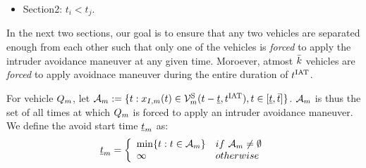 {\begin{itemize}
\begin{itemize}
\item Section12: Next we want to make sure that $\veh_i$ is far away from this set such that the intruder will need atleast a duration of $\brd$ to reach any state such that $\state_{\intr,i}$ is on the boundary of the avoid set of $\veh_i$. In relative co-ordinates, if we compute min-min set and augment it on set in Section 11, and ensure that the boundary of the avoid region is outside this augmented set then we are done. Draw a table listing the duration of each set. Mention the duration relationships. Draw a diagram showing different sets. 
\item Section13: Obstacle computation. First compute the directly induced obstacle by $\veh_j$ at time $t$ for all possible $\tsa$. Then compute the obstacle that $\veh_i$ need to avoid at any future time for different $\tsa$. Therefore, compute the BRS that it needs to avoid at $\tsa$.    
\end{itemize}
\item Section2: $t_i < t_j$.
\end{itemize}
}

In the next two sections, our goal is to ensure that any two vehicles are separated enough from each other such that only one of the vehicles is \textit{forced} to apply the intruder avoidance maneuver at any given time. Moroever, atmost $\bar{k}$ vehicles are \textit{forced} to apply avoidnace maneuver during the entire duration of $t^\text{IAT}$. 

For vehicle $Q_m$, let $\mathcal{A}_{m} := \{t: x_{I,m}(t) \in \mathcal{V}^{\text{S}}_{m}(t-\underline{t}, t^\text{IAT}), t \in [\underline{t}, \bar{t}]\}$. $\mathcal{A}_{m}$ is thus the set of all times at which $Q_m$ is forced to apply an intruder avoidance maneuver. We define the avoid start time $\underline{t}_m$ as:
\begin{equation}
\underline{t}_m  = 
\left \{ 
\begin{array}{ll}
\min\{t: t \in  \mathcal{A}_{m}\} & \relax{if~} \mathcal{A}_{m} \neq \emptyset\\
\infty & \relax{otherwise}
\end{array}
\right.
\end{equation}  

